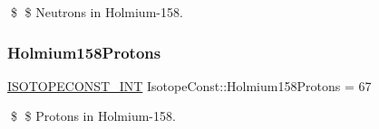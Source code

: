 \$ \$ Neutrons in Holmium-\/158. \mbox{\label{group___isotope_const-_holmium-_ho158_ga0c35ecd24f6411e33f7efb9b5756a533}} 
\subsubsection{\texorpdfstring{Holmium158\+Protons}{Holmium158Protons}}
{\footnotesize\ttfamily \mbox{\hyperlink{group___isotope_const-_macros_ga5f18360b3e99483a35c32d789e62621c}{I\+S\+O\+T\+O\+P\+E\+C\+O\+N\+S\+T\+\_\+\+I\+NT}} Isotope\+Const\+::\+Holmium158\+Protons = 67}

\$ \$ Protons in Holmium-\/158. 